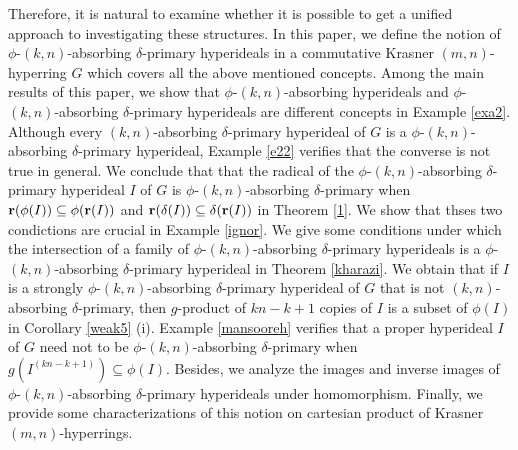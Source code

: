 \documentclass[preprint,review,10pt]{amsart}
\theoremstyle{definition}
\theoremstyle{remark}
\numberwithin{equation}{section}
\begin{document}
Therefore, it is  natural to examine
whether it is possible to get a unified approach to investigating these structures. 
In this paper, we define the notion of $\phi$-$(k,n)$-absorbing $\delta$-primary hyperideals in a commutative Krasner $(m,n)$-hyperring $G$ which covers all the  above mentioned concepts. 
Among the main results of this paper,  we show that  $\phi$-$(k,n)$-absorbing hyperideals and $\phi$-$(k,n)$-absorbing $\delta$-primary hyperideals are different concepts in Example \ref{exa2}. Although every  $(k,n)$-absorbing $\delta$-primary hyperideal of $G$ is  a $\phi$-$(k,n)$-absorbing $\delta$-primary hyperideal, Example \ref{e22} verifies that the converse is not true in general. We conclude that 
that the radical of the $\phi$-$(k,n)$-absorbing $\delta$-primary hyperideal $I$ of $G$ is $\phi$-$(k,n)$-absorbing $\delta$-primary when ${\bf r}(\phi(I)) \subseteq \phi({\bf r}(I))$ and ${\bf r}(\delta(I)) \subseteq \delta({\bf r}(I))$ in Theorem \ref{1}. We show that thses two condictions are crucial in Example \ref{ignor}. We give some conditions under which the intersection of a family of $\phi$-$(k,n)$-absorbing $\delta$-primary hyperideals is a $\phi$-$(k,n)$-absorbing $\delta$-primary hyperideal in Theorem \ref{kharazi}. We obtain that if $I$ is a strongly $\phi$-$(k,n)$-absorbing $\delta$-primary hyperideal of $G$  that is not  $(k,n)$-absorbing $\delta$-primary, then $g$-product of $kn-k+1$ copies of  $I$ is a subset of $\phi(I)$ in Corollary \ref{weak5} (i). Example \ref{mansooreh} verifies that a proper hyperideal $I$ of $G$ need not to be  $\phi$-$(k,n)$-absorbing $\delta$-primary when  $g(I^{(kn-k+1)}) \subseteq \phi(I)$. Besides, we analyze the images and inverse images of $\phi$-$(k,n)$-absorbing $\delta$-primary hyperideals
under homomorphism. Finally, we provide some characterizations of this notion on cartesian product of Krasner $(m, n)$-hyperrings. 







\end{document}
